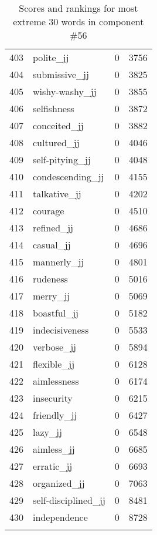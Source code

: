 \begin{longtable}[!htbp]{| rlr@{.}l |}
    403 & polite\_jj & 0 & 3756 \\
    404 & submissive\_jj & 0 & 3825 \\
    405 & wishy-washy\_jj & 0 & 3855 \\
    406 & selfishness & 0 & 3872 \\
    407 & conceited\_jj & 0 & 3882 \\
    408 & cultured\_jj & 0 & 4046 \\
    409 & self-pitying\_jj & 0 & 4048 \\
    410 & condescending\_jj & 0 & 4155 \\
    411 & talkative\_jj & 0 & 4202 \\
    412 & courage & 0 & 4510 \\
    413 & refined\_jj & 0 & 4686 \\
    414 & casual\_jj & 0 & 4696 \\
    415 & mannerly\_jj & 0 & 4801 \\
    416 & rudeness & 0 & 5016 \\
    417 & merry\_jj & 0 & 5069 \\
    418 & boastful\_jj & 0 & 5182 \\
    419 & indecisiveness & 0 & 5533 \\
    420 & verbose\_jj & 0 & 5894 \\
    421 & flexible\_jj & 0 & 6128 \\
    422 & aimlessness & 0 & 6174 \\
    423 & insecurity & 0 & 6215 \\
    424 & friendly\_jj & 0 & 6427 \\
    425 & lazy\_jj & 0 & 6548 \\
    426 & aimless\_jj & 0 & 6685 \\
    427 & erratic\_jj & 0 & 6693 \\
    428 & organized\_jj & 0 & 7063 \\
    429 & self-disciplined\_jj & 0 & 8481 \\
    430 & independence & 0 & 8728 \\
    \hline
    \caption{Scores and rankings for most extreme 30 words in component \#56} \\
\end{longtable}
